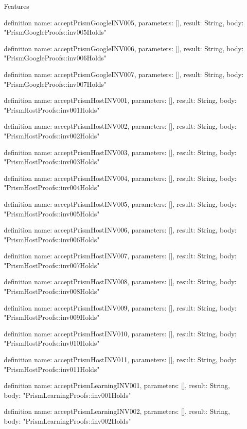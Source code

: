 \begin{lexlean}{Features}
\begin{semanticmodule}
definition{
  name: acceptPrismGoogleINV005,
  parameters: [],
  result: String,
  body: "PrismGoogleProofs::inv005Holds"
}

definition{
  name: acceptPrismGoogleINV006,
  parameters: [],
  result: String,
  body: "PrismGoogleProofs::inv006Holds"
}

definition{
  name: acceptPrismGoogleINV007,
  parameters: [],
  result: String,
  body: "PrismGoogleProofs::inv007Holds"
}

definition{
  name: acceptPrismHostINV001,
  parameters: [],
  result: String,
  body: "PrismHostProofs::inv001Holds"
}

definition{
  name: acceptPrismHostINV002,
  parameters: [],
  result: String,
  body: "PrismHostProofs::inv002Holds"
}

definition{
  name: acceptPrismHostINV003,
  parameters: [],
  result: String,
  body: "PrismHostProofs::inv003Holds"
}

definition{
  name: acceptPrismHostINV004,
  parameters: [],
  result: String,
  body: "PrismHostProofs::inv004Holds"
}

definition{
  name: acceptPrismHostINV005,
  parameters: [],
  result: String,
  body: "PrismHostProofs::inv005Holds"
}

definition{
  name: acceptPrismHostINV006,
  parameters: [],
  result: String,
  body: "PrismHostProofs::inv006Holds"
}

definition{
  name: acceptPrismHostINV007,
  parameters: [],
  result: String,
  body: "PrismHostProofs::inv007Holds"
}

definition{
  name: acceptPrismHostINV008,
  parameters: [],
  result: String,
  body: "PrismHostProofs::inv008Holds"
}

definition{
  name: acceptPrismHostINV009,
  parameters: [],
  result: String,
  body: "PrismHostProofs::inv009Holds"
}

definition{
  name: acceptPrismHostINV010,
  parameters: [],
  result: String,
  body: "PrismHostProofs::inv010Holds"
}

definition{
  name: acceptPrismHostINV011,
  parameters: [],
  result: String,
  body: "PrismHostProofs::inv011Holds"
}

definition{
  name: acceptPrismLearningINV001,
  parameters: [],
  result: String,
  body: "PrismLearningProofs::inv001Holds"
}

definition{
  name: acceptPrismLearningINV002,
  parameters: [],
  result: String,
  body: "PrismLearningProofs::inv002Holds"
}


\end{semanticmodule}
\end{lexlean}
